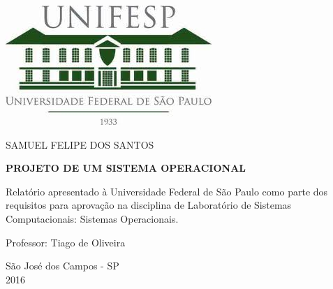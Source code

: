 \begin{titlepage}

\begin{flushright}


\flushright
\includegraphics[scale=0.5]{figuras/logo_unifesp.jpg}



\vspace*{\fill}


{\large SAMUEL FELIPE DOS SANTOS}

\vspace{\fill}


{\bf \large PROJETO DE UM SISTEMA OPERACIONAL}

\vspace{1.5cm}

\begin{minipage}{7.94cm}

\small Relatório apresentado à Universidade Federal de São Paulo como parte dos requisitos para aprovação na disciplina de Laboratório de Sistemas Computacionais: Sistemas Operacionais.
\end{minipage}

\vspace{\fill}

{\small Professor: Tiago de Oliveira}

\vspace{\fill}

\end{flushright}


\begin{center}
{São José dos Campos - SP}\\[0.2cm]
{2016}
\end{center}
\end{titlepage}
